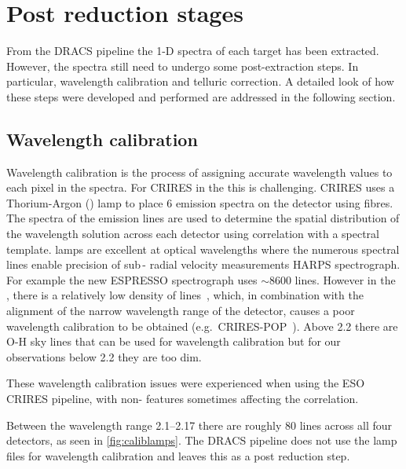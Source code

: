 
\section{Post reduction stages}
\label{sec:posreduction}
From the {DRACS} pipeline the 1-D spectra of each target has been extracted.
However, the spectra still need to undergo some post-extraction steps.
In particular, wavelength calibration and telluric correction.
A detailed look of how these steps were developed and performed are addressed in the following section.

\subsection{Wavelength calibration}
\label{subsec:wavecalib}
Wavelength calibration is the process of assigning accurate wavelength values to each pixel in the spectra.
For {CRIRES} in the \nir{} this is challenging.
{CRIRES} uses a Thorium-Argon (\thar) lamp to place 6 emission spectra on the detector using fibres.
The spectra of the \thar{} emission lines are used to determine the spatial distribution of the wavelength solution across each detector using correlation with a spectral template.
\thar{} lamps are excellent at optical wavelengths where the numerous spectral lines enable precision of sub\,-\mps{} radial velocity measurements {HARPS} spectrograph.
For example the new ESPRESSO spectrograph uses \(\sim8600\) \thar{} lines.
However in the \nir{}, there is a relatively low density of \thar{} lines~\citep{kerber_laboratory_2009}, which, in combination with the alignment of the narrow wavelength range of the detector, causes a poor wavelength calibration to be obtained (e.g.\ {CRIRES}-POP~\citep{nicholls_crirespop_2017}).
Above 2.2\um{} there are {O-H} sky lines that can be used for wavelength calibration but for our observations below 2.2\um{} they are too dim.

These wavelength calibration issues were experienced when using the {ESO} {CRIRES} pipeline, with non-\thar{} features sometimes affecting the correlation.

Between the wavelength range 2.1--2.17\um{} there are roughly 80 \thar{} lines across all four detectors, as seen in \cref{fig:caliblamps}.
The {DRACS} pipeline does not use the \thar{} lamp files for wavelength calibration and leaves this as a post reduction step.

